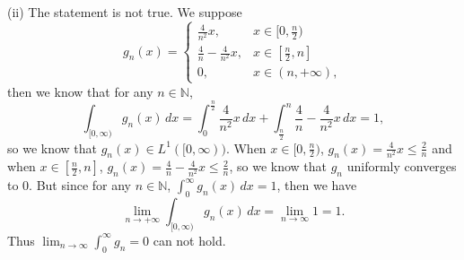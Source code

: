 \documentclass[12pt]{article}
\begin{document}
(ii) The statement is not true. We suppose 
\begin{equation*}
g_{n}(x) =
\left\{
             \begin{array}{cl}
             \frac{4}{n^{2}} x, & x \in [0, \frac{n}{2}) \\
             \frac{4}{n} - \frac{4}{n^{2}} x, & x \in [\frac{n}{2}, n]  \\
             0, & x \in (n, + \infty),
             \end{array}
\right.
\end{equation*}
then we know that for any $n \in \mathbb{N}$,
\begin{equation*}
    \int_{[0, \infty)}^{} g_{n} (x) \, d x = \int_{0}^{\frac{n}{2}} \frac{4}{n^{2}} x \, d x + \int_{\frac{n}{2}}^{n} \frac{4}{n} - \frac{4}{n^{2}} x \, d x = 1,
\end{equation*}
so we know that $g_{n} (x) \in L^{1}([0, \infty))$. When $x \in [0, \frac{n}{2})$, $g_{n}(x) = \frac{4}{n^{2}} x \leq \frac{2}{n}$ and when $x \in [\frac{n}{2}, n]$, $g_{n} (x) = \frac{4}{n} - \frac{4}{n^{2}} x \leq \frac{2}{n}$, so we know that $g_{n}$ uniformly converges to $0$. But since for any $n \in \mathbb{N}$, $\int_{0}^{\infty} g_{n}(x) \, d x  = 1$, then we have
\begin{equation*}
    \lim_{n \to + \infty} \int_{[0, \infty)}^{} g_{n} (x) \, d x = \lim_{n \to \infty} 1 = 1.
\end{equation*}
Thus $\lim_{n \to \infty} \int_{0}^{\infty} g_{n} = 0$ can not hold.
\end{document}
